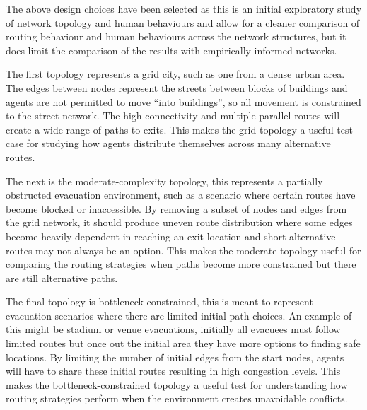 \documentclass[12pt,a4paper]{report}
\begin{document}
The above design choices have been selected as this is an initial exploratory study of network topology and human behaviours and allow for a cleaner comparison of routing behaviour and human behaviours across the network structures, but it does limit the comparison of the results with empirically informed networks.

The first topology represents a grid city, such as one from a dense urban area. The edges between nodes represent the streets between blocks of buildings and agents are not permitted to move “into buildings”, so all movement is constrained to the street network.  The high connectivity and multiple parallel routes will create a wide range of paths to exits. This makes the grid topology a useful test case for studying how agents distribute themselves across many alternative routes.

The next is the moderate-complexity topology, this represents a partially obstructed evacuation environment, such as a scenario where certain routes have become blocked or inaccessible. By removing a subset of nodes and edges from the grid network, it should produce uneven route distribution where some edges become heavily dependent in reaching an exit location and short alternative routes may not always be an option. This makes the moderate topology useful for comparing the routing strategies when paths become more constrained but there are still alternative paths.

The final topology is bottleneck-constrained, this is meant to represent evacuation scenarios where there are limited initial path choices. An example of this might be stadium or venue evacuations, initially all evacuees must follow limited routes but once out the initial area they have more options to finding safe locations. By limiting the number of initial edges from the start nodes, agents will have to share these initial routes resulting in high congestion levels. This makes the bottleneck-constrained topology a useful test for understanding how routing strategies perform when the environment creates unavoidable conflicts.
\end{document}
